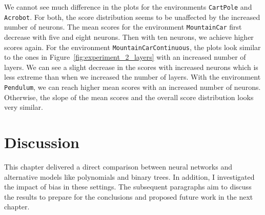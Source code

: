 We cannot see much difference in the plots for the environments \verb|CartPole| and \verb|Acrobot|. For both, the score distribution seems to be unaffected by the increased number of neurons. The mean scores for the environment \verb|MountainCar| first decrease with five and eight neurons. Then with ten neurons, we achieve higher scores again. For the environment \verb|MountainCarContinuous|, the plots look similar to the ones in Figure~\ref{fig:experiment_2_layers} with an increased number of layers. We can see a slight decrease in the scores with increased neurons which is less extreme than when we increased the number of layers. With the environment \verb|Pendulum|, we can reach higher mean scores with an increased number of neurons. Otherwise, the slope of the mean scores and the overall score distribution looks very similar.


\section{Discussion}
This chapter delivered a direct comparison between neural networks and alternative models like polynomials and binary trees. In addition, I investigated the impact of bias in these settings. The subsequent paragraphs aim to discuss the results to prepare for the conclusions and proposed future work in the next chapter.

